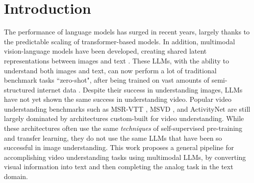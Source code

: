 \section{Introduction}

The performance of language models has surged in recent years, largely thanks to the predictable scaling of transformer-based models.
In addition, multimodal vision-language models have been developed,  creating shared latent representations between images and text \cite{clip} \cite{coca} \cite{mmbt}.
These LLMs, with the ability to understand both images and text, can now perform a lot of traditional benchmark tasks ``zero-shot", after being trained on vast amounts of semi-structured internet data \cite{gpt4vision} \cite{clip} \cite{gemini} \cite{flamingo}.
Despite their success in understanding images, LLMs have not yet shown the same success in understanding video.
Popular video understanding benchmarks such as MSR-VTT \cite{msr-vtt}, MSVD \cite{msvd}, and ActivityNet \cite{activitynet} are still largely dominated by architectures custom-built for video understanding.
While these architectures often use the same \textit{techniques} of self-supervised pre-training and transfer learning, they do not use the same LLMs that have been so successful in image understanding.
This work proposes a general pipeline for accomplishing video understanding tasks using multimodal LLMs, by converting visual information into text and then completing the analog task in the text domain.

